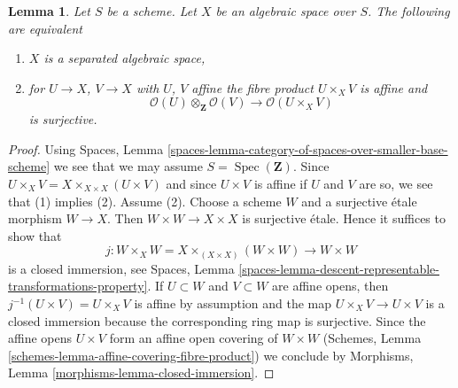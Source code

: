 \documentclass[10pt,a4paper]{amsart}
\theoremstyle{plain}
\newtheorem{lemma}[subsection]{Lemma}
\theoremstyle{definition}
\theoremstyle{remark}
\numberwithin{equation}{subsection}
\def\Spec{\mathop{\mathrm{Spec}}}
\begin{document}
\begin{lemma}
\label{lemma-characterize-separated}
Let $S$ be a scheme. Let $X$ be an algebraic space over $S$.
The following are equivalent
\begin{enumerate}
\item $X$ is a separated algebraic space,
\item for $U \to X$, $V \to X$ with $U$, $V$ affine
the fibre product $U \times_X V$ is affine and
$$
\mathcal{O}(U) \otimes_\mathbf{Z} \mathcal{O}(V)
\longrightarrow
\mathcal{O}(U \times_X V)
$$
is surjective.
\end{enumerate}
\end{lemma}

\begin{proof}
Using Spaces, Lemma
\ref{spaces-lemma-category-of-spaces-over-smaller-base-scheme}
we see that we may assume $S = \Spec(\mathbf{Z})$.
Since $U \times_X V = X \times_{X \times X} (U \times V)$
and since $U \times V$ is affine if $U$ and $V$ are so,
we see that (1) implies (2).
Assume (2). Choose a scheme $W$ and a surjective \'etale morphism
$W \to X$. Then $W \times W \to X \times X$ is surjective \'etale.
Hence it suffices to show that
$$
j : W \times_X W = X \times_{(X \times X)} (W \times W) \to W \times W
$$
is a closed immersion, see Spaces, Lemma
\ref{spaces-lemma-descent-representable-transformations-property}.
If $U \subset W$ and $V \subset W$ are affine opens, then
$j^{-1}(U \times V) = U \times_X V$ is affine by assumption
and the map $U \times_X V \to U \times V$ is a closed immersion
because the corresponding ring map is surjective.
Since the affine opens $U \times V$ form an affine open covering
of $W \times W$
(Schemes, Lemma \ref{schemes-lemma-affine-covering-fibre-product})
we conclude by
Morphisms, Lemma \ref{morphisms-lemma-closed-immersion}.
\end{proof}
\end{document}

